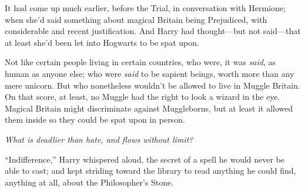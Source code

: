 It had come up much earlier, before the Trial, in conversation with Hermione; when she’d said something about magical Britain being Prejudiced, with considerable and recent justification. And Harry had thought—but not said—that at least she’d been let into Hogwarts to be spat upon.

Not like certain people living in certain countries, who were, it was \emph{said}, as human as anyone else; who were \emph{said} to be sapient beings, worth more than any mere unicorn. But who nonetheless wouldn’t be allowed to live in Muggle Britain. On that score, at least, no Muggle had the right to look a wizard in the eye. Magical Britain might discriminate against Muggleborns, but at least it allowed them inside so they could be spat upon in person.

\emph{What is deadlier than hate, and flows without limit?}

“Indifference,” Harry whispered aloud, the secret of a spell he would never be able to cast; and kept striding toward the library to read anything he could find, anything at all, about the Philosopher’s Stone.
